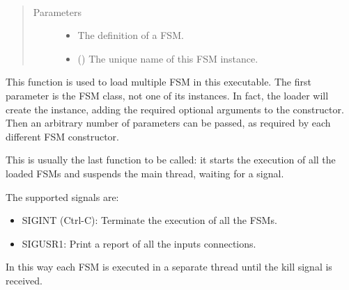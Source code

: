 \documentclass[letterpaper,10pt,english]{sphinxmanual}
\begin{document}

\begin{fulllineitems}
\label{\detokenize{loader:loader.loader.load}}~\begin{quote}\begin{description}
\item[{Parameters}] \leavevmode\begin{itemize}
\item {} 
 \textendash{} The definition of a FSM.

\item {} 
 () \textendash{} The unique name of this FSM instance.

\end{itemize}

\end{description}\end{quote}

This function is used to load multiple FSM in this executable. The first
parameter is the FSM class, not one of its instances. In fact, the loader
will create the instance, adding the required optional arguments to the
constructor. Then an arbitrary number of parameters can be passed, as
required by each different FSM constructor.

\end{fulllineitems}


\begin{fulllineitems}
\label{\detokenize{loader:loader.loader.start}}
This is usually the last function to be called: it starts the execution of
all the loaded FSMs and suspends the main thread, waiting for a signal.

The supported signals are:
\begin{itemize}
\item {} 
SIGINT (Ctrl-C): Terminate the execution of all the FSMs.

\item {} 
SIGUSR1: Print a report of all the inputs connections.

\end{itemize}

In this way each FSM is executed in a separate thread until the kill signal
is received.

\end{fulllineitems}
\end{document}
